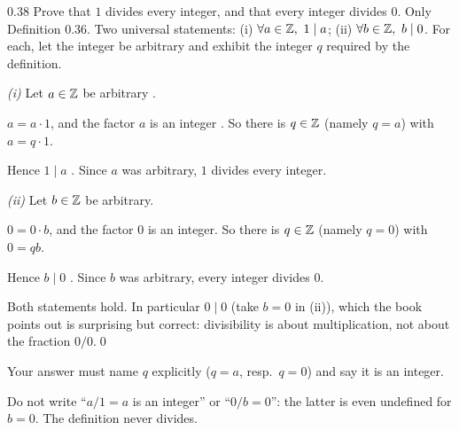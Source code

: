 \begin{bookex}[recommended]{0.38}
Prove that $1$ divides every integer, and that every integer divides $0$.
\solution
\given Only Definition 0.36.
\goal Two universal statements: (i) $\forall a\in\mathbb{Z},\ 1\mid a$; (ii) $\forall b\in\mathbb{Z},\ b\mid0$. 
\plan For each, let the integer be arbitrary and exhibit the integer $q$ required by the definition.
\begin{steps}
\item \emph{(i)} Let $a\in\mathbb{Z}$ be arbitrary .
\item $a=a\cdot1$, and the factor $a$ is an integer . So there is $q\in\mathbb{Z}$ (namely $q=a$) with $a=q\cdot1$.
\item Hence $1\mid a$ . Since $a$ was arbitrary, $1$ divides every integer.
\item \emph{(ii)} Let $b\in\mathbb{Z}$ be arbitrary.
\item $0=0\cdot b$, and the factor $0$ is an integer. So there is $q\in\mathbb{Z}$ (namely $q=0$) with $0=qb$.
\item Hence $b\mid0$ . Since $b$ was arbitrary, every integer divides $0$.
\end{steps}
\conclusion Both statements hold. In particular $0\mid0$ (take $b=0$ in (ii)), which the book points out is surprising but correct: divisibility is about multiplication, not about the fraction $0/0$.\qed
\begin{compare}
\item Your answer must name $q$ explicitly ($q=a$, resp.\ $q=0$) and say it is an integer.
\item Do not write ``$a/1=a$ is an integer'' or ``$0/b=0$'': the latter is even undefined for $b=0$. The definition never divides.
\end{compare}
\end{bookex}

